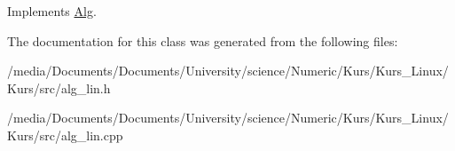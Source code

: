 Implements \hyperlink{classAlg_aa2436420b85976a48465408e9d86d425}{Alg}.



The documentation for this class was generated from the following files:\begin{DoxyCompactItemize}
\item 
/media/Documents/Documents/University/science/Numeric/Kurs/Kurs\_\-Linux/Kurs/src/alg\_\-lin.h\item 
/media/Documents/Documents/University/science/Numeric/Kurs/Kurs\_\-Linux/Kurs/src/alg\_\-lin.cpp\end{DoxyCompactItemize}
